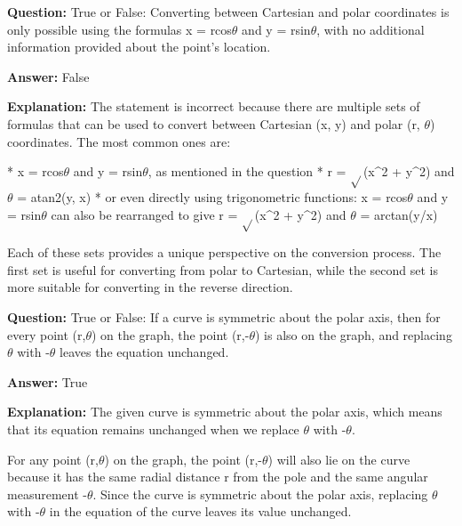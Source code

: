 \documentclass{article}
\begin{document}
                \vspace{0.5cm} 
        
            
                \textbf {Question:} True or False: Converting between Cartesian and polar coordinates is only possible using the formulas x = rcos\ensuremath{\theta} and y = rsin\ensuremath{\theta}, with no additional information provided about the point's location.
                
                \textbf{Answer:} False

                \textbf{Explanation:} The statement is incorrect because there are multiple sets of formulas that can be used to convert between Cartesian (x, y) and polar (r, \ensuremath{\theta}) coordinates. The most common ones are:

* x = rcos\ensuremath{\theta} and y = rsin\ensuremath{\theta}, as mentioned in the question
* r = \ensuremath{\sqrt{}}(x{\textasciicircum}2 + y{\textasciicircum}2) and \ensuremath{\theta} = atan2(y, x)
* or even directly using trigonometric functions: x = rcos\ensuremath{\theta} and y = rsin\ensuremath{\theta} can also be rearranged to give r = \ensuremath{\sqrt{}}(x{\textasciicircum}2 + y{\textasciicircum}2) and \ensuremath{\theta} = arctan(y/x)

Each of these sets provides a unique perspective on the conversion process. The first set is useful for converting from polar to Cartesian, while the second set is more suitable for converting in the reverse direction.
                
                \vspace{0.5cm} 
        
            
                \textbf {Question:} True or False: If a curve is symmetric about the polar axis, then for every point (r,\ensuremath{\theta}) on the graph, the point (r,-\ensuremath{\theta}) is also on the graph, and replacing \ensuremath{\theta} with -\ensuremath{\theta} leaves the equation unchanged.
                
                \textbf{Answer:} True

                \textbf{Explanation:} The given curve is symmetric about the polar axis, which means that its equation remains unchanged when we replace \ensuremath{\theta} with -\ensuremath{\theta}.

For any point (r,\ensuremath{\theta}) on the graph, the point (r,-\ensuremath{\theta}) will also lie on the curve because it has the same radial distance r from the pole and the same angular measurement -\ensuremath{\theta}. Since the curve is symmetric about the polar axis, replacing \ensuremath{\theta} with -\ensuremath{\theta} in the equation of the curve leaves its value unchanged.
\end{document}
